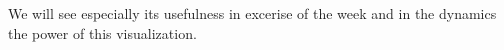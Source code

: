 We will see especially its usefulness in excerise of the week and in the dynamics the power of this visualization.